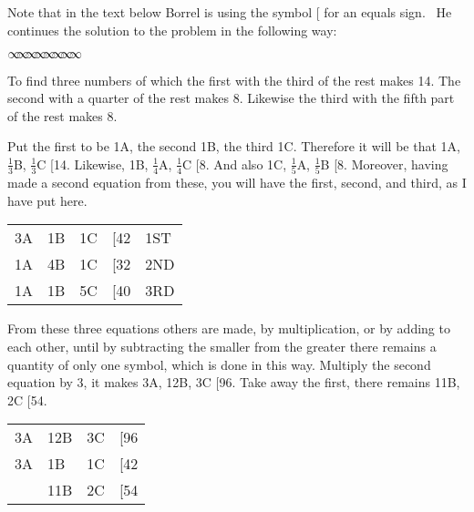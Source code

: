 \documentclass[11pt]{article}%
\theoremstyle{definition}
\newcommand{\sep}{\vspace{-3pt} \begin{center}
{\mathversion{normal}
$\infty \mspace{-5.5mu} \infty \mspace{-5.5mu}
\infty \mspace{-5.5mu} \infty \mspace{-5.5mu}
\infty \mspace{-5.5mu} \infty \mspace{-5.5mu}
\infty \mspace{-5.5mu} \infty$}
\end{center} \vspace{-3pt}}
\begin{document}
Note that in the text below Borrel is using the symbol [ for an equals sign.
\ He continues the solution to the problem in the following way:%

\sep


\textsf{To find three numbers of which the first with the third of the rest
makes 14. The second with a quarter of the rest makes 8. Likewise the third
with the fifth part of the rest makes 8.}

\textsf{Put the first to be 1A, the second 1B, the third 1C. Therefore it will
be that 1A, }$\frac{1}{3}$\textsf{B, }$\frac{1}{3}$\textsf{C [14. Likewise,
1B, }$\frac{1}{4}$\textsf{A, }$\frac{1}{4}$\textsf{C [8. And also 1C, }%
$\frac{1}{5}$\textsf{A, }$\frac{1}{5}$\textsf{B [8. Moreover, having made a
second equation from these, you will have the first, second, and third, as I
have put here.}

\begin{center}%
\begin{tabular}
[c]{lllll}%
\textsf{3A} & \textsf{1B} & \textsf{1C} & \textsf{[42} & \textsf{1ST}\\
\textsf{1A} & \textsf{4B} & \textsf{1C} & \textsf{[32} & \textsf{2ND}\\
\textsf{1A} & \textsf{1B} & \textsf{5C} & \textsf{[40} & \textsf{3RD}%
\end{tabular}



\end{center}

\textsf{From these three equations others are made, by multiplication, or by
adding to each other, until by subtracting the smaller from the greater there
remains a quantity of only one symbol, which is done in this way. Multiply the
second equation by 3, it makes 3A, 12B, 3C [96. Take away the first, there
remains 11B, 2C [54.}

\begin{center}%
\begin{tabular}
[c]{llll}%
\textsf{3A} & \textsf{12B} & \textsf{3C} & \textsf{[96}\\
\textsf{3A} & \textsf{1B} & \textsf{1C} & \textsf{[42}\\
\textsf{ } & \textsf{11B} & \textsf{2C} & \textsf{[54}%
\end{tabular}



\end{center}
\end{document}
